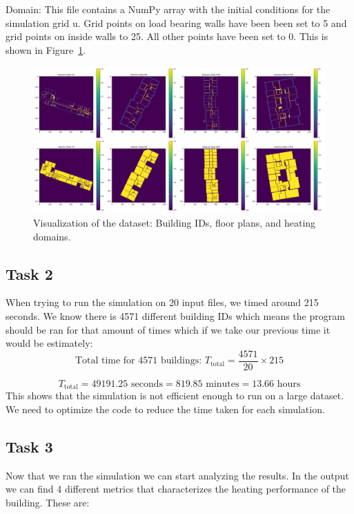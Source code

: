 \documentclass[a4paper,12pt]{article}
\begin{document}
Domain: This file contains a NumPy array with the initial conditions for the
simulation grid u. Grid points on load bearing walls have been been set to 5 and grid points on
inside walls to 25. All other points have been set to 0.
This is shown in Figure~\ref{fig:combined_plot}.

\begin{figure}[h!]
        \centering
        \includegraphics[width=1\textwidth]{Plots/combined_plot.png}
        \caption{Visualization of the dataset: Building IDs, floor plans, and heating domains.}
        \label{fig:combined_plot}
\end{figure}

\subsection{Task 2}
When trying to run the simulation on 20 input files, we timed around 215 seconds. We know there is 4571 different building IDs which means the program should be ran for that amount of times which if we take our previous time it would be estimately:
\[
\text{Total time for 4571 buildings: } T_{\text{total}} = \frac{4571}{20} \times 215
\]

\[
T_{\text{total}} = 49191.25 \text{ seconds} = 819.85 \text{ minutes} = 13.66 \text{ hours}
\]
This shows that the simulation is not efficient enough to run on a large dataset. We need to optimize the code to reduce the time taken for each simulation.


\subsection{Task 3}
Now that we ran the simulation we can start analyzing the results. In the output we can find 4 different metrics that characterizes the heating performance of the building. These are:
\end{document}
